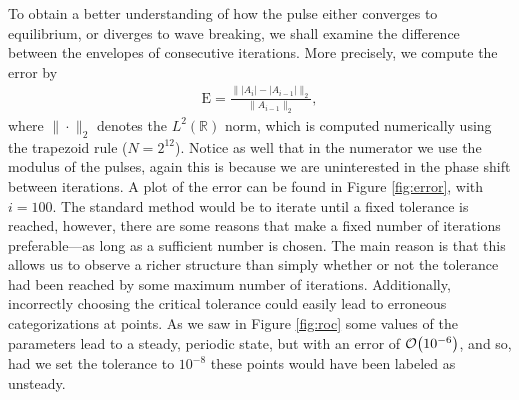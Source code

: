 To obtain a better understanding of how the pulse either converges to equilibrium, or diverges to wave breaking, we shall examine the difference between the envelopes of consecutive iterations. More precisely, we compute the error by
\begin{align}
\textrm{E} = \frac{\| |A_i| - |A_{i-1}| \|_2}{\| A_{i-1} \|_2},
\label{eq:error}
\end{align}
where $\| \cdot \|_2$ denotes the $L^2(\mathbb{R})$ norm, which is computed numerically using the trapezoid rule ($N = 2^{12}$). Notice as well that in the numerator we use the modulus of the pulses, again this is because we are uninterested in the phase shift between iterations. A plot of the error can be found in Figure \ref{fig:error}, with $i = 100$. The standard method would be to iterate until a fixed tolerance is reached, however, there are some reasons that make a fixed number of iterations preferable---as long as a sufficient number is chosen. The main reason is that this allows us to observe a richer structure than simply whether or not the tolerance had been reached by some maximum number of iterations. Additionally, incorrectly choosing the critical tolerance could easily lead to erroneous categorizations at points. As we saw in Figure \ref{fig:roc} some values of the parameters lead to a steady, periodic state, but with an error of $\bigO{10^{-6}}$, and so, had we set the tolerance to $10^{-8}$ these points would have been labeled as unsteady. \\

